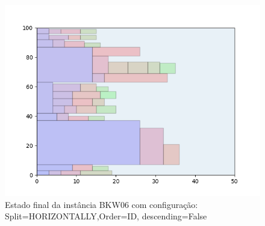 \begin{figure}[H]
    \centering
    \caption[]{Estado final da instância BKW06 com configuração: Split=HORIZONTALLY,Order=ID, descending=False}
    \label{fig:bkw06-horizontally-id-false}
    \includegraphics[scale=0.5]{output/figures/bkw/bkw06/horizontally/id/false/00}
\end{figure}